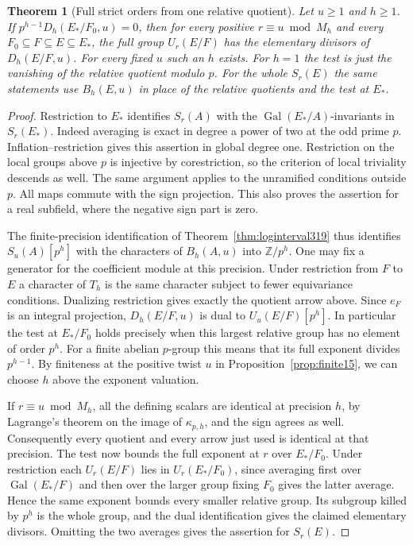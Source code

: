 \documentclass[a4paper,11pt]{article}
\newtheorem{theorem}[proposition]{Theorem}
\theoremstyle{definition}
\theoremstyle{remark}
\newcommand{\ZZ}{\mathbb Z}\newcommand{\ord}{\operatorname{ord}}
\numberwithin{equation}{section}
\begin{document}
\begin{theorem}[Full strict orders from one relative quotient]\leavevmode
\label{thm:relativeprogress325}
Let \(u\ge1\) and \(h\ge1\). If
\(p^{h-1}D_h(E_*/F_0,u)=0\), then for every positive
\(r\equiv u\bmod M_h\) and every \(F_0\subseteq F\subseteq
E\subseteq E_*\), the full group \(U_r(E/F)\) has the
elementary divisors of \(D_h(E/F,u)\). For every fixed \(u\)
such an \(h\) exists. For \(h=1\) the test is just the
vanishing of the relative quotient modulo \(p\).
For the whole \(S_r(E)\) the same statements use \(B_h(E,u)\)
in place of the relative quotients and the test at \(E_*\).
\end{theorem}
\begin{proof}
Restriction to \(E_*\) identifies \(S_r(A)\) with the
\(\operatorname{Gal}(E_*/A)\)-invariants in \(S_r(E_*)\).
Indeed averaging is exact in degree a power of two at the odd
prime \(p\). Inflation--restriction gives this assertion in
global degree one. Restriction on the local groups above
\(p\) is injective by corestriction, so the criterion of
local triviality descends as well. The same argument applies
to the unramified conditions outside \(p\). All maps commute
with the sign projection. This also proves the assertion for
a real subfield, where the negative sign part is zero.

The finite-precision identification of
Theorem~\ref{thm:loginterval319} thus identifies \(S_u(A)[p^h]\)
with the characters of \(B_h(A,u)\) into \(\ZZ/p^h\).
One may fix a generator for the coefficient module at this
precision. Under restriction from \(F\) to \(E\) a character
of \(T_h\) is the same character subject to fewer equivariance
conditions. Dualizing restriction gives exactly the quotient
arrow above. Since \(e_F\) is an integral projection,
\(D_h(E/F,u)\) is dual to \(U_u(E/F)[p^h]\). In particular
the test at \(E_*/F_0\) holds precisely when this largest
relative group has no element of order \(p^h\). For a finite
abelian \(p\)-group this means that its full exponent divides
\(p^{h-1}\). By finiteness at the positive twist \(u\) in
Proposition~\ref{prop:finite15}, we can choose \(h\) above
the exponent valuation.

If \(r\equiv u\bmod M_h\), all the defining scalars are
identical at precision \(h\), by Lagrange's theorem on the
image of \(\kappa_{p,h}\), and the sign agrees as well.
Consequently every quotient and every arrow just used is
identical at that precision. The test now bounds the full
exponent at \(r\) over \(E_*/F_0\). Under restriction each
\(U_r(E/F)\) lies in \(U_r(E_*/F_0)\), since averaging first
over \(\operatorname{Gal}(E_*/F)\) and then over the larger
group fixing \(F_0\) gives the latter average. Hence the
same exponent bounds every smaller relative group. Its
subgroup killed by \(p^h\) is the whole group, and the
dual identification gives the claimed elementary divisors.
Omitting the two averages gives the assertion for \(S_r(E)\).
\end{proof}
\end{document}
